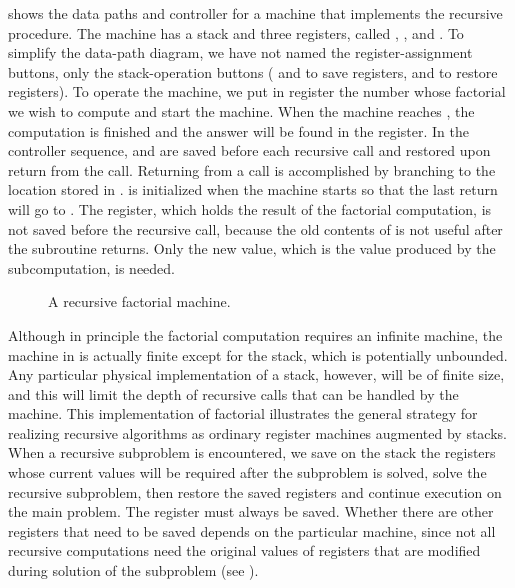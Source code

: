  shows the data paths and controller for a machine that implements the recursive  procedure.
The machine has a stack and three registers, called , , and .
To simplify the data-path diagram, we have not named the register-assignment buttons, only the stack-operation buttons ( and  to save registers,  and  to restore registers).
To operate the machine, we put in register  the number whose factorial we wish to compute and start the machine.
When the machine reaches , the computation is finished and the answer will be found in the  register.
In the controller sequence,  and  are saved before each recursive call and restored upon return from the call.
Returning from a call is accomplished by branching to the location stored in .
 is initialized when the machine starts so that the last return will go to .
The  register, which holds the result of the factorial computation, is not saved before the recursive call, because the old contents of  is not useful after the subroutine returns.
Only the new value, which is the value produced by the subcomputation, is needed.

\begin{figure}[tp]
	\centering
	
	\caption{
		A recursive factorial machine.
	}
	\label{Figure 5.11}
\end{figure}

Although in principle the factorial computation requires an infinite machine, the machine in  is actually finite except for the stack, which is potentially unbounded.
Any particular physical implementation of a stack, however, will be of finite size, and this will limit the depth of recursive calls that can be handled by the machine.
This implementation of factorial illustrates the general strategy for realizing recursive algorithms as ordinary register machines augmented by stacks.
When a recursive subproblem is encountered, we save on the stack the registers whose current values will be required after the subproblem is solved, solve the recursive subproblem, then restore the saved registers and continue execution on the main problem.
The  register must always be saved.
Whether there are other registers that need to be saved depends on the particular machine, since not all recursive computations need the original values of registers that are modified during solution of the subproblem (see ).



